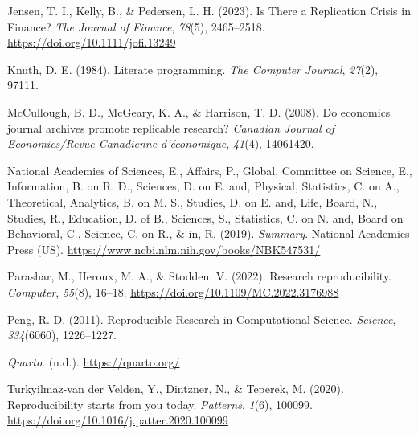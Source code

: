 \documentclass[
  a4paper,
]{article}
\newlength{\cslhangindent}
\newenvironment{CSLReferences}[2] %
 {\begin{list}{}{%
  \setlength{\itemindent}{0pt}
  \setlength{\leftmargin}{0pt}
  \setlength{\parsep}{0pt}
  \ifodd #1
   \setlength{\leftmargin}{\cslhangindent}
   \setlength{\itemindent}{-1\cslhangindent}
  \fi
  \setlength{\itemsep}{#2\baselineskip}}}
 {\end{list}}
\begin{document}
\begin{CSLReferences}{1}{0}
Jensen, T. I., Kelly, B., \& Pedersen, L. H. (2023). Is There a
Replication Crisis in Finance? \emph{The Journal of Finance},
\emph{78}(5), 2465--2518. \url{https://doi.org/10.1111/jofi.13249}

Knuth, D. E. (1984). Literate programming. \emph{The Computer Journal},
\emph{27}(2), 97111.

McCullough, B. D., McGeary, K. A., \& Harrison, T. D. (2008). Do
economics journal archives promote replicable research? \emph{Canadian
Journal of Economics/Revue Canadienne d'économique}, \emph{41}(4),
14061420.

National Academies of Sciences, E., Affairs, P., Global, Committee on
Science, E., Information, B. on R. D., Sciences, D. on E. and, Physical,
Statistics, C. on A., Theoretical, Analytics, B. on M. S., Studies, D.
on E. and, Life, Board, N., Studies, R., Education, D. of B., Sciences,
S., Statistics, C. on N. and, Board on Behavioral, C., Science, C. on
R., \& in, R. (2019). \emph{Summary}. National Academies Press (US).
\url{https://www.ncbi.nlm.nih.gov/books/NBK547531/}

Parashar, M., Heroux, M. A., \& Stodden, V. (2022). Research
reproducibility. \emph{Computer}, \emph{55}(8), 16--18.
\url{https://doi.org/10.1109/MC.2022.3176988}

Peng, R. D. (2011).
\href{https://www.ncbi.nlm.nih.gov/pubmed/22144613}{Reproducible
{Research} in {Computational Science}}. \emph{Science},
\emph{334}(6060), 1226--1227.

\emph{Quarto}. (n.d.). \url{https://quarto.org/}

Turkyilmaz-van der Velden, Y., Dintzner, N., \& Teperek, M. (2020).
Reproducibility starts from you today. \emph{Patterns}, \emph{1}(6),
100099. \url{https://doi.org/10.1016/j.patter.2020.100099}

\end{CSLReferences}
\end{document}
